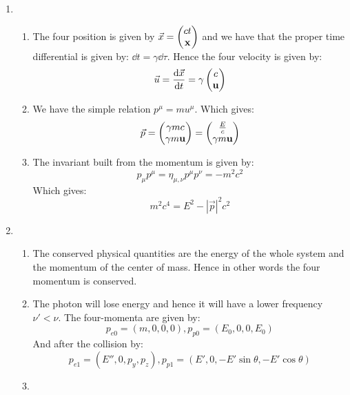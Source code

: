 \documentclass[10pt,a4paper]{book}
\begin{document}
\begin{enumerate}
\item \begin{enumerate}
\item The four position is given by $\vec{x} = \begin{pmatrix}
ct \\ \vb{x}
\end{pmatrix}$ and we have that the proper time differential is given by: $\dd t = \gamma \dd \tau$. Hence the four velocity is given by:
\[
\vec{u} = \dv{\vec{x}}{t} = \gamma  \begin{pmatrix}
c\\ \vb{u}
\end{pmatrix}
\]
\item We have the simple relation $p^\mu = m u^\mu$. Which gives:
\[
\vec{p} = \begin{pmatrix}
\gamma m c \\ \gamma m \vb{u}
\end{pmatrix} = \begin{pmatrix}
\frac{E}{c} \\ \gamma m \vb{u}
\end{pmatrix}
\]
\item The invariant built from the momentum is given by:
\[
p_\mu p^\mu = \eta_{\mu,\nu} p^\mu p^\nu = -m^2 c^2
\]
Which gives:
\[
m^2 c^4 = E^2 - |\vec{p}|^2 c^2
\]
\end{enumerate}
\item \begin{enumerate}
\item The conserved physical quantities are the energy of the whole system and the momentum of the center of mass. Hence in other words the four momentum is conserved.
\item The photon will lose energy and hence it will have a lower frequency $\nu' < \nu$. The four-momenta are given by:
\[
p_{e0} = (m, 0, 0, 0), p_{p0} = (E_0, 0, 0, E_0)
\]
And after the collision by:
\[
p_{e1} = (E'', 0, p_y, p_z), p_{p1} = (E', 0, - E' \sin\theta, - E' \cos \theta) 
\]
\item  
\end{enumerate}
\end{enumerate}


\chapter{}

\chapter{}
\end{document}
